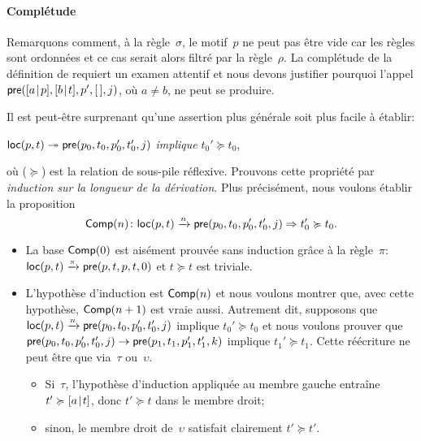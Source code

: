 \paragraph{Complétude}

Remarquons comment, à la règle~\(\sigma\), le motif~\(p\) ne peut pas
être vide car les règles sont ordonnées et ce cas serait alors filtré
par la règle~\(\rho\). La complétude de la définition de 
requiert un examen attentif et nous devons justifier pourquoi l'appel
\(\textsf{pre}([{a}\!\mid\!{p}],[{b}\!\mid\!{t}],p',[\,],j)\), où \(a \neq b\), ne
peut se produire.

Il est peut-être surprenant qu'une assertion plus générale soit plus
facile à établir:
\begin{center}
\(\textsf{loc}(p,t) \twoheadrightarrow \textsf{pre}(p_0,t_0,p_0',t_0',j)\)
\textsl{implique} \(t_0' \succcurlyeq t_0\),
\end{center}
où (\(\succcurlyeq\)) est la relation de sous-pile réflexive.
Prouvons cette propriété par \emph{induction sur la longueur de la
  dérivation}. Plus précisément, nous voulons établir la proposition
\begin{equation*}
\pred{Comp}{n} \colon \fun{loc}(p,t) \xrightarrow{\smash{n}}
\fun{pre}(p_0,t_0,p_0',t_0',j) \Rightarrow t_0' \succcurlyeq t_0.
\index{Comp@\predName{Comp}}
\end{equation*}
\begin{itemize}

  \item La base \(\textsf{Comp}({0})\) est aisément prouvée sans induction
  grâce à la règle~\(\pi\): \(\textsf{loc}(p,t) \xrightarrow{\smash{\pi}}
  \textsf{pre}(p,t,p,t,0)\) et \(t \succcurlyeq t\) est triviale.

  \item L'hypothèse d'induction est \(\textsf{Comp}({n})\) et nous voulons
  montrer que, avec cette hypothèse, \(\textsf{Comp}({n+1})\) est vraie
  aussi. Autrement dit, supposons que \(\textsf{loc}(p,t)
  \xrightarrow{\smash{n}} \textsf{pre}(p_0,t_0,p_0',t_0',j)\) implique
  \(t_0' \succcurlyeq t_0\) et nous voulons prouver que
  \(\textsf{pre}(p_0,t_0,p_0',t_0',j) \rightarrow
  \textsf{pre}(p_1,t_1,p_1',t_1',k)\) implique \(t_1' \succcurlyeq
  t_1\). Cette réécriture ne peut être que via~\(\tau\)
  ou~\(\upsilon\).
  \begin{itemize}

    \item Si~\(\tau\), l'hypothèse d'induction appliquée au membre
    gauche entraîne \(t' \succcurlyeq [{a}\!\mid\!{t}]\), donc \(t'
    \succcurlyeq t\) dans le membre droit;

    \item sinon, le membre droit de~\(\upsilon\) satisfait clairement
    \(t' \succcurlyeq t'\).

      \end{itemize}
\end{itemize}
